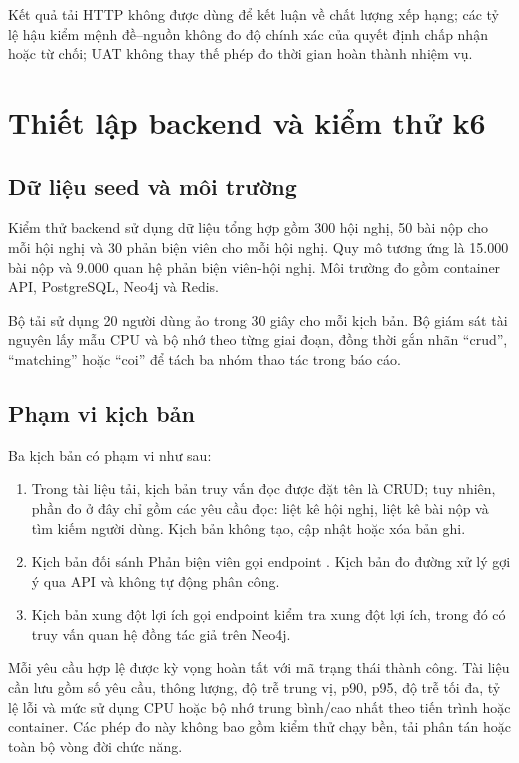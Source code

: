 Kết quả tải HTTP không được dùng để kết luận về chất lượng xếp hạng; các tỷ lệ hậu kiểm mệnh đề--nguồn không đo độ chính xác của quyết định chấp nhận hoặc từ chối; UAT không thay thế phép đo thời gian hoàn thành nhiệm vụ.

\section{Thiết lập backend và kiểm thử k6}
\label{appc:backend-contract}

\subsection{Dữ liệu seed và môi trường}

Kiểm thử backend sử dụng dữ liệu tổng hợp gồm 300 hội nghị, 50 bài nộp cho mỗi hội nghị và 30 phản biện viên cho mỗi hội nghị. Quy mô tương ứng là 15.000 bài nộp và 9.000 quan hệ phản biện viên-hội nghị. Môi trường đo gồm container API, PostgreSQL, Neo4j và Redis.

Bộ tải sử dụng 20 người dùng ảo trong 30 giây cho mỗi kịch bản. Bộ giám sát tài nguyên lấy mẫu CPU và bộ nhớ theo từng giai đoạn, đồng thời gắn nhãn ``crud'', ``matching'' hoặc ``coi'' để tách ba nhóm thao tác trong báo cáo.

\subsection{Phạm vi kịch bản}

Ba kịch bản có phạm vi như sau:

\begin{enumerate}
  \item Trong tài liệu tải, kịch bản truy vấn đọc được đặt tên là CRUD; tuy nhiên, phần đo ở đây chỉ gồm các yêu cầu đọc: liệt kê hội nghị, liệt kê bài nộp và tìm kiếm người dùng. Kịch bản không tạo, cập nhật hoặc xóa bản ghi.
  \item Kịch bản đối sánh Phản biện viên gọi endpoint . Kịch bản đo đường xử lý gợi ý qua API và không tự động phân công.
  \item Kịch bản xung đột lợi ích gọi endpoint kiểm tra xung đột lợi ích, trong đó có truy vấn quan hệ đồng tác giả trên Neo4j.
\end{enumerate}

Mỗi yêu cầu hợp lệ được kỳ vọng hoàn tất với mã trạng thái thành công. Tài liệu cần lưu gồm số yêu cầu, thông lượng, độ trễ trung vị, p90, p95, độ trễ tối đa, tỷ lệ lỗi và mức sử dụng CPU hoặc bộ nhớ trung bình/cao nhất theo tiến trình hoặc container. Các phép đo này không bao gồm kiểm thử chạy bền, tải phân tán hoặc toàn bộ vòng đời chức năng.

